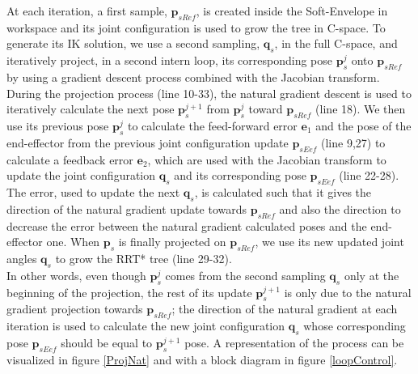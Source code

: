 \documentclass[letterpaper, 10 pt, conference]{ieeeconf}  %
\newcommand{\mb}[1]{{\boldsymbol{#1}}}
\begin{document}
At each iteration, a first sample, $\mb{p}_{sRef}$, is created inside the Soft-Envelope in workspace and its joint configuration is used to grow the tree in C-space. To generate its IK solution, we use a second sampling, $\mb{q}_s$, in the full C-space, and iteratively project, in a second intern loop, its corresponding pose $\bm{p}_s^j$ onto  $\mb{p}_{sRef}$ by using a gradient descent process combined with the Jacobian transform.\\
During the projection process (line 10-33), the natural gradient descent is used to iteratively calculate the next pose $\mb{p}_s^{j+1}$ from $\mb{p}_s^j$ toward $\mb{p}_{sRef}$ (line 18). We then use its previous pose $\mb{p}_s^j$ to calculate the feed-forward error $\mb{e}_1$ and the pose of the end-effector from the previous joint configuration update  $\mb{p}_{sEef}$  (line 9,27) to calculate a feedback error $\mb{e}_2$, which are used with the Jacobian transform to update the joint configuration $\mb{q}_s$ and its corresponding pose $\mb{p}_{sEef}$ (line 22-28). The error, used to update the next $\mb{q}_s$, is calculated such that it gives the direction of the natural gradient update towards $\mb{p}_{sRef}$  and also the direction to decrease the error between the natural gradient calculated poses and the end-effector one.  When $\mb{p}_s$ is finally projected on $\mb{p}_{sRef}$, we use its new updated joint angles $\mb{q}_s$ to grow the RRT* tree (line 29-32). \\
In other words, even though $\mb{p}_s^{j}$ comes from the second sampling $\mb{q}_s$ only at the beginning of the projection, the rest of its update  $\mb{p}_s^{j+1}$ is only due to the natural gradient projection towards $\mb{p}_{sRef}$; the direction of the natural gradient at each iteration is used to calculate the new joint configuration $\mb{q}_s$ whose corresponding pose $\mb{p}_{sEef}$ should be equal to $\mb{p}_s^{j+1}$ pose.
	  A representation of the process can be visualized in figure \ref{ProjNat} and with a block diagram in figure \ref{loopControl}.\\
\end{document}
